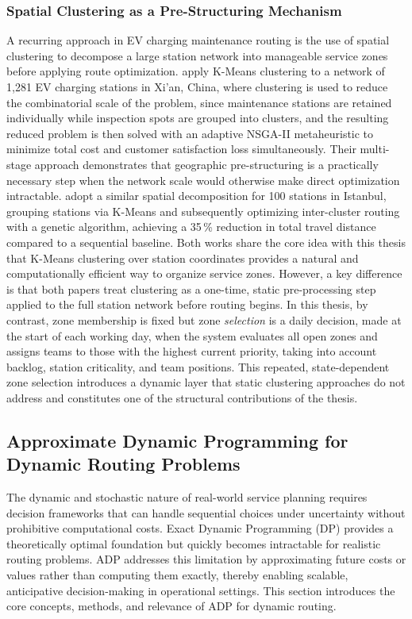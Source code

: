 \documentclass[12pt,oneside]{article}
\begin{document}
\subsubsection{Spatial Clustering as a Pre-Structuring Mechanism}
A recurring approach in EV charging maintenance routing is the use of spatial clustering to decompose a large station network into manageable service zones before applying route optimization. \citet{zhang2024routing} apply K-Means clustering to a network of 1{,}281 EV charging stations in Xi'an, China, where clustering is used to reduce the combinatorial scale of the problem, since maintenance stations are retained individually while inspection spots are grouped into clusters, and the resulting reduced problem is then solved with an adaptive NSGA-II metaheuristic to minimize total cost and customer satisfaction loss simultaneously. Their multi-stage approach demonstrates that geographic pre-structuring is a practically necessary step when the network scale would otherwise make direct optimization intractable. \citet{yenigun2025smart} adopt a similar spatial decomposition for 100 stations in Istanbul, grouping stations via K-Means and subsequently optimizing inter-cluster routing with a genetic algorithm, achieving a 35\,\% reduction in total travel distance compared to a sequential baseline.
Both works share the core idea with this thesis that K-Means clustering over station coordinates provides a natural and computationally efficient way to organize service zones. However, a key difference is that both papers treat clustering as a one-time, static pre-processing step applied to the full station network before routing begins. In this thesis, by contrast, zone membership is fixed but zone \emph{selection} is a daily decision, made at the start of each working day, when the system evaluates all open zones and assigns teams to those with the highest current priority, taking into account backlog, station criticality, and team positions. This repeated, state-dependent zone selection introduces a dynamic layer that static clustering approaches do not address and constitutes one of the structural contributions of the thesis.


\subsection{Approximate Dynamic Programming for Dynamic Routing Problems}\label{subsec_approximate_dynamic_programming_for_dynamic_routing_problems}
The dynamic and stochastic nature of real-world service planning requires decision frameworks that can handle sequential choices under uncertainty without prohibitive computational costs. Exact Dynamic Programming (DP) provides a theoretically optimal foundation but quickly becomes intractable for realistic routing problems. ADP addresses this limitation by approximating future costs or values rather than computing them exactly, thereby enabling scalable, anticipative decision-making in operational settings. This section introduces the core concepts, methods, and relevance of ADP for dynamic routing. 
\end{document}
